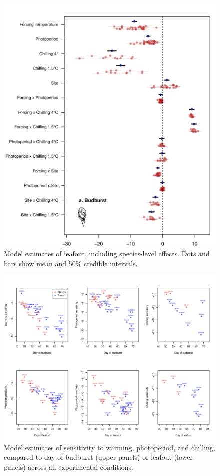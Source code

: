 \documentclass{article}
\begin{document}
\begin{figure}
\label{figS3}
\includegraphics[width=1\textwidth, page=2]{Fig1_bb_lo+sp}
\caption{Model estimates of leafout, including species-level effects. Dots and bars show mean and 50\% credible intervals.}
\end{figure}

\begin{figure}
\label{figS4}
\includegraphics[width=1\textwidth]{Sens_vs_day_treeshrub}
\caption{Model estimates of sensitivity to warming, photoperiod, and chilling, compared to day of budburst (upper panels) or leafout (lower panels) across all experimental conditions.}
\end{figure}
\end{document}
